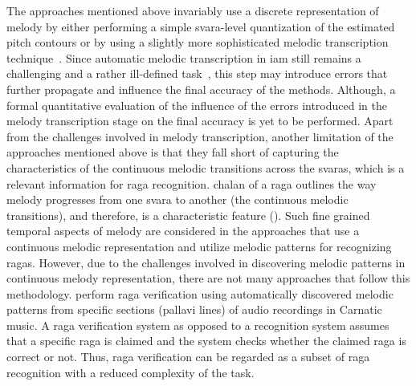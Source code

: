 The approaches mentioned above invariably use a discrete representation of melody by either performing a simple \gls{svara}-level quantization of the estimated pitch contours or by using a slightly more sophisticated melodic transcription technique~\citep{pandey2003tansen}. Since automatic melodic transcription in \gls{iam} still remains a challenging and a rather ill-defined task~\citep{widdess1994involving}, this step may introduce errors that further propagate and influence the final accuracy of the methods. Although, a formal quantitative evaluation of the influence of the errors introduced in the melody transcription stage on the final accuracy is yet to be performed. Apart from the challenges involved in melody transcription, another limitation of the approaches mentioned above is that they fall short of capturing the characteristics of the continuous melodic transitions across the \glspl{svara}, which is a relevant information for \gls{raga} recognition. \Gls{chalan} of a \gls{raga} outlines the way melody progresses from one \gls{svara} to another (the continuous melodic transitions), and therefore, is a characteristic feature (). Such fine grained temporal aspects of melody are considered in the approaches that use a continuous melodic representation and utilize melodic patterns for recognizing \glspl{raga}. However, due to the challenges involved in discovering melodic patterns in continuous melody representation, there are not many approaches that follow this methodology. \cite{shrey_ISMIR_2015} perform \gls{raga} verification using automatically discovered melodic patterns from specific sections (\gls{pallavi} lines) of audio recordings in Carnatic music. A \gls{raga} verification system as opposed to a recognition system assumes that a specific \gls{raga} is claimed and the system checks whether the claimed \gls{raga} is correct or not. Thus, \gls{raga} verification can be regarded as a subset of \gls{raga} recognition with a reduced complexity of the task. 

